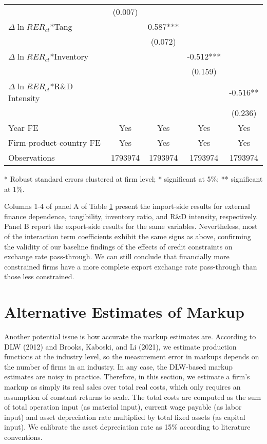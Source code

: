 \begin{table}[htbp]
\begin{threeparttable}
\begin{tabular}{lcccc}
		& (0.007) &       &       &  \\
		$\Delta \ln RER_{ct}$*Tang &       & 0.587*** &       &  \\
		&       & (0.072) &       &  \\
		$\Delta \ln RER_{ct}$*Inventory &       &       & -0.512*** &  \\
		&       &       & (0.159) &  \\
		$\Delta \ln RER_{ct}$*R\&D Intensity &       &       &       & -0.516** \\
		&       &       &       & (0.236) \\
		Year FE  & Yes   & Yes   & Yes   & Yes \\
		Firm-product-country FE & Yes   & Yes   & Yes   & Yes \\
		Observations & 1793974 & 1793974 & 1793974 & 1793974 \\
		\bottomrule
	\end{tabular}
	\label{tab6.1}
	\begin{tablenotes}
		\footnotesize
		\item[*] Robust standard errors clustered at firm level; * significant at 5\%; ** significant at 1\%.
	\end{tablenotes}
	\end{threeparttable}
\end{table}

Columns 1-4 of panel A of Table \ref{tab6.1} present the import-side results for external finance dependence, tangibility, inventory ratio, and R\&D intensity, respectively. Panel B report the export-side results for the same variables. Nevertheless, most of the interaction term coefficients exhibit the same signs as above, confirming the validity of our baseline findings of the effects of credit constraints on exchange rate pass-through. We can still conclude that financially more constrained firms have a more complete export exchange rate pass-through than those less constrained.

\section{Alternative Estimates of Markup}

Another potential issue is how accurate the markup estimates are. According to DLW (2012)\cite{dlw2012} and Brooks, Kaboski, and Li (2021)\cite{bkl2021}, we estimate production functions at the industry level, so the measurement error in markups depends on the number of firms in an industry. In any case, the DLW-based markup estimates are noisy in practice. Therefore, in this section, we estimate a firm's markup as simply its real sales over total real costs, which only requires an assumption of constant returns to scale. The total costs are computed as the sum of total operation input (as material input), current wage payable (as labor input) and asset depreciation rate multiplied by total fixed assets (as capital input). We calibrate the asset depreciation rate as 15\% according to literature conventions.

